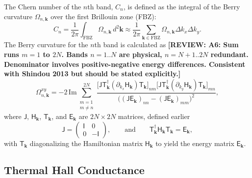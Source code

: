 \documentclass[aps, prx, nofootinbib, superscriptaddress]{revtex4-2}
\newcommand{\REVIEW}[1]{{\color{reviewcolor}\bfseries [REVIEW: #1]}}
\newcommand{\kvec}{\mathbf{k}}
\begin{document}
The Chern number of the $n$th band, $C_n$, is defined as the integral of the Berry curvature $\Omega_{n, \kvec}$ over the first Brillouin zone (FBZ):
\begin{equation}
    C_n = \frac{1}{2\pi} \int_{\text{FBZ}} \Omega_{n, \kvec} \, d^2\kvec 
    \approx \frac{1}{2\pi} \sum_{\kvec \in \text{FBZ}} \Omega_{n, \kvec} \Delta k_x \Delta k_y.
\end{equation}
The Berry curvature for the $n$th band is calculated as
\REVIEW{A6: Sum runs $m=1$ to $2N$. Bands $n=1..N$ are physical, $n=N+1..2N$ redundant. Denominator involves positive-negative energy differences. Consistent with Shindou 2013 but should be stated explicitly.}
\begin{equation}
    \Omega_{n, \kvec}^{xy} =
    - 2 \, \mathrm{Im} \sum_{\substack{m = 1 \\ m \neq n}}^{2N}
    \frac{
        \big[ \mathsf{J} \mathsf{T}^{\dagger}_{\kvec} (\partial_{k_x} \mathsf{H}_{\kvec}) \mathsf{T}_{\kvec} \big]_{nm}
        \big[ \mathsf{J} \mathsf{T}^{\dagger}_{\kvec} (\partial_{k_y} \mathsf{H}_{\kvec}) \mathsf{T}_{\kvec} \big]_{mn}
    }{\big( (\mathsf{J} \mathsf{E}_{\kvec})_{nn} - (\mathsf{J} \mathsf{E}_{\kvec})_{mm} \big)^2},
\end{equation}
where $\mathsf{J}$, $\mathsf{H}_{\kvec}$, $\mathsf{T}_{\kvec}$, and $\mathsf{E}_{\kvec}$ are $2N \times 2N$ matrices, defined earlier
\begin{equation}
    \mathsf{J} = 
    \begin{pmatrix}
        \mathsf{I} & 0 \\ 0 & -\mathsf{I}
    \end{pmatrix}, 
    \qquad \text{and} \qquad
    \mathsf{T}^{\dagger}_{\kvec} \mathsf{H}_{\kvec} \mathsf{T}_{\kvec} = \mathsf{E}_{\kvec},
\end{equation}
with $\mathsf{T}_{\kvec}$ diagonalizing the Hamiltonian matrix $\mathsf{H}_{\kvec}$ to yield the energy matrix $\mathsf{E}_{\kvec}$.




\subsection{Thermal Hall Conductance}\label{subsec: Thermal Hall Conductance}
\end{document}
